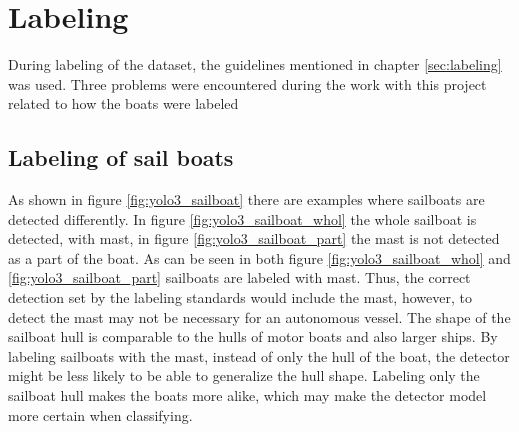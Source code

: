 \newpage

\section{Labeling}

During labeling of the dataset, the guidelines mentioned in chapter \ref{sec:labeling} was used. Three problems were encountered during the work with this project related to how the boats were labeled

\subsection{Labeling of sail boats}

As shown in figure \ref{fig:yolo3_sailboat} there are examples where sailboats are detected differently. In figure \ref{fig:yolo3_sailboat_whol} the whole sailboat is detected, with mast, in figure \ref{fig:yolo3_sailboat_part} the mast is not detected as a part of the boat. As can be seen in both figure \ref{fig:yolo3_sailboat_whol} and \ref{fig:yolo3_sailboat_part} sailboats are labeled with mast. Thus, the correct detection set by the labeling standards would include the mast, however, to detect the mast may not be necessary for an autonomous vessel. The shape of the sailboat hull is comparable to the hulls of motor boats and also larger ships. By labeling sailboats with the mast, instead of only the hull of the boat, the detector might be less likely to be able to generalize the hull shape. Labeling only the sailboat hull makes the boats more alike, which may make the detector model more certain when classifying. 




